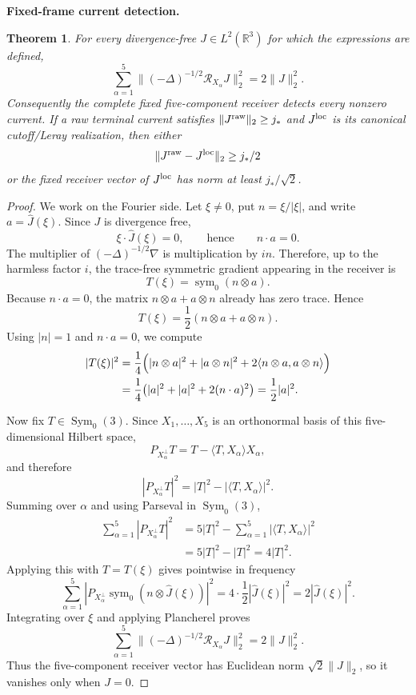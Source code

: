 \documentclass[11pt]{article}
\newtheorem{theorem}{Theorem}[section]
\theoremstyle{definition}\newtheorem{problem}[theorem]{Problem}
\theoremstyle{definition}
\theoremstyle{remark}
\begin{document}
\medskip
\noindent\textbf{Fixed-frame current detection.}
\begin{theorem}\label{thm:five-frame}
For every divergence-free $J\in L^2(\mathbb R^3)$ for which the expressions are defined,
\[
\boxed{
\sum_{\alpha=1}^5
\|(-\Delta)^{-1/2}\mathcal R_{X_\alpha}J\|_2^2
=2\|J\|_2^2.}
\]
Consequently the complete fixed five-component receiver detects every nonzero current.  If a raw terminal current satisfies $\|J^{\rm raw}\|_2\ge j_*$ and $J^{\rm loc}$ is its canonical cutoff/Leray realization, then either
\[
\|J^{\rm raw}-J^{\rm loc}\|_2\ge j_*/2
\]
or the fixed receiver vector of $J^{\rm loc}$ has norm at least $j_*/\sqrt2$.
\end{theorem}
\begin{proof}
We work on the Fourier side.  Let \(\xi\ne0\), put
\(n=\xi/|\xi|\), and write \(a=\widehat J(\xi)\).  Since \(J\) is
divergence free,
\[
 \xi\cdot\widehat J(\xi)=0,
 \qquad\text{hence}\qquad n\cdot a=0.
\]
The multiplier of \((-\Delta)^{-1/2}\nabla\) is multiplication by
\(in\).  Therefore, up to the harmless factor \(i\), the trace-free symmetric
gradient appearing in the receiver is
\[
 T(\xi)=\operatorname{sym}_0(n\otimes a).
\]
Because \(n\cdot a=0\), the matrix \(n\otimes a+a\otimes n\) already has zero
trace.  Hence
\[
 T(\xi)=\frac12(n\otimes a+a\otimes n).
\]
Using \(|n|=1\) and \(n\cdot a=0\), we compute
\[
\begin{aligned}
 |T(\xi)|^2
 &=\frac14\Bigl(|n\otimes a|^2+|a\otimes n|^2
 +2\langle n\otimes a,a\otimes n\rangle\Bigr)\\
 &=\frac14\bigl(|a|^2+|a|^2+2(n\cdot a)^2\bigr)
 =\frac12|a|^2.
\end{aligned}
\]

Now fix \(T\in\operatorname{Sym}_0(3)\).  Since
\(X_1,\dots,X_5\) is an orthonormal basis of this five-dimensional Hilbert
space,
\[
 P_{X_\alpha^\perp}T
 =T-\langle T,X_\alpha\rangle X_\alpha,
\]
and therefore
\[
 |P_{X_\alpha^\perp}T|^2
 =|T|^2-|\langle T,X_\alpha\rangle|^2.
\]
Summing over \(\alpha\) and using Parseval in
\(\operatorname{Sym}_0(3)\),
\[
\begin{aligned}
 \sum_{\alpha=1}^5|P_{X_\alpha^\perp}T|^2
 &=5|T|^2-
   \sum_{\alpha=1}^5|\langle T,X_\alpha\rangle|^2\\
 &=5|T|^2-|T|^2
 =4|T|^2.
\end{aligned}
\]
Applying this with \(T=T(\xi)\) gives pointwise in frequency
\[
 \sum_{\alpha=1}^5
 \left|
 P_{X_\alpha^\perp}
 \operatorname{sym}_0(n\otimes\widehat J(\xi))
 \right|^2
 =4\cdot\frac12|\widehat J(\xi)|^2
 =2|\widehat J(\xi)|^2.
\]
Integrating over \(\xi\) and applying Plancherel proves
\[
 \sum_{\alpha=1}^5
 \|(-\Delta)^{-1/2}\mathcal R_{X_\alpha}J\|_2^2
 =2\|J\|_2^2.
\]
Thus the five-component receiver vector has Euclidean norm
\(\sqrt2\|J\|_2\), so it vanishes only when \(J=0\).


\end{proof}
\end{document}
